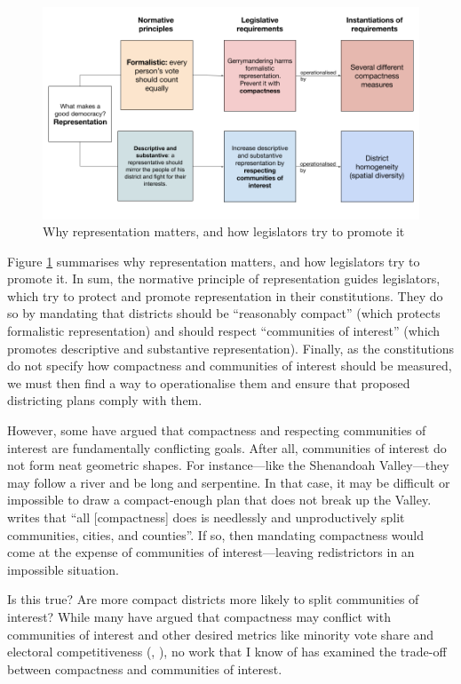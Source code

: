 \documentclass[]{article}
\begin{document}
\begin{figure}
\centering
\includegraphics{./img/why_compactness_and_community1.png}
\caption{Why representation matters, and how legislators try to promote
it\label{flowchart}}
\end{figure}

Figure \ref{flowchart} summarises why representation matters, and how
legislators try to promote it. In sum, the normative principle of
representation guides legislators, which try to protect and promote
representation in their constitutions. They do so by mandating that
districts should be ``reasonably compact'' (which protects formalistic
representation) and should respect ``communities of interest'' (which
promotes descriptive and substantive representation). Finally, as the
constitutions do not specify how compactness and communities of interest
should be measured, we must then find a way to operationalise them and
ensure that proposed districting plans comply with them.

However, some have argued that compactness and respecting communities of
interest are fundamentally conflicting goals. After all, communities of
interest do not form neat geometric shapes. For instance---like the
Shenandoah Valley---they may follow a river and be long and serpentine.
In that case, it may be difficult or impossible to draw a compact-enough
plan that does not break up the Valley. \citeauthor{wolf2015} writes
that ``all {[}compactness{]} does is needlessly and unproductively split
communities, cities, and counties''. If so, then mandating compactness
would come at the expense of communities of interest---leaving
redistrictors in an impossible situation.

Is this true? Are more compact districts more likely to split
communities of interest? While many have argued that compactness may
conflict with communities of interest and other desired metrics like
minority vote share and electoral competitiveness (\citep{cain1984},
\cite{karlan1989}), no work that I know of has examined the trade-off
between compactness and communities of interest.
\end{document}
